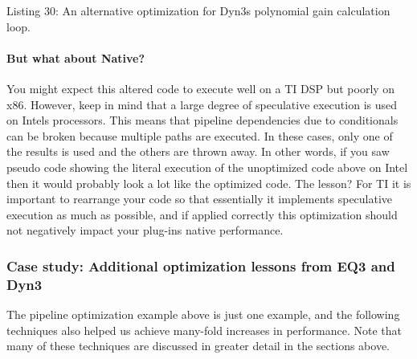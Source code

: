 \begin{DoxyCode}{0}
\DoxyCodeLine{\{}
\DoxyCodeLine{}
\DoxyCodeLine{}
\DoxyCodeLine{\} }
\end{DoxyCode}
  Listing 30\+: An alternative optimization for Dyn3\textquotesingle{}s polynomial gain calculation loop.

\hypertarget{a00832_subsubsection__but_what_about_native__}{}\paragraph{But what about Native?}\label{a00832_subsubsection__but_what_about_native__}
 You might expect this altered code to execute well on a TI D\+SP but poorly on x86. However, keep in mind that a large degree of speculative execution is used on Intel\textquotesingle{}s processors. This means that pipeline dependencies due to conditionals can be broken because multiple paths are executed. In these cases, only one of the results is used and the others are thrown away. In other words, if you saw pseudo code showing the literal execution of the unoptimized code above on Intel then it would probably look a lot like the optimized code. The lesson? For TI it is important to rearrange your code so that essentially it implements speculative execution as much as possible, and if applied correctly this optimization should not negatively impact your plug-\/in\textquotesingle{}s native performance.

\hypertarget{a00832_subsection__case_study_additional_optimization_lessons_from_eq3_and_dyn3}{}\subsubsection{Case study\+: Additional optimization lessons from E\+Q3 and Dyn3}\label{a00832_subsection__case_study_additional_optimization_lessons_from_eq3_and_dyn3}
 The pipeline optimization example above is just one example, and the following techniques also helped us achieve many-\/fold increases in performance. Note that many of these techniques are discussed in greater detail in the sections above.

